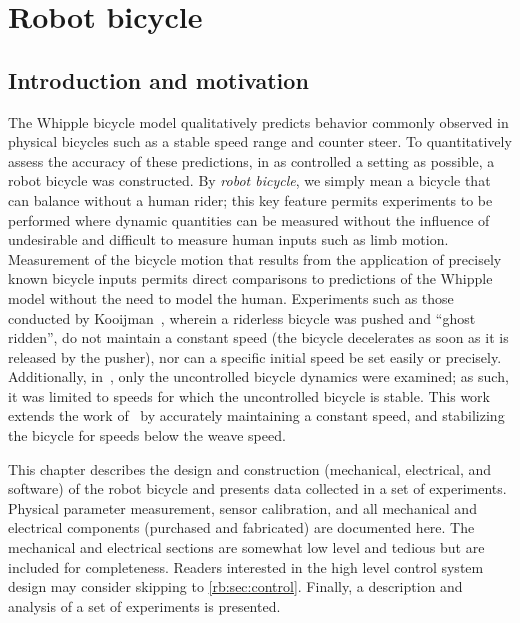 \chapter{Robot bicycle} \label{chapter4}

\section{Introduction and motivation} \label{rb:sec:intro}

The Whipple bicycle model qualitatively predicts behavior commonly observed in
physical bicycles such as a stable speed range and counter steer. To
quantitatively assess the accuracy of these predictions, in as controlled a
setting as possible, a robot bicycle was constructed. By \textit{robot
bicycle}, we simply mean a bicycle that can balance without a human rider; this key
feature permits experiments to be performed where dynamic quantities can be
measured without the influence of undesirable and difficult to measure human
inputs such as limb motion. Measurement of the bicycle motion that results from
the application of precisely known bicycle inputs permits direct comparisons to
predictions of the Whipple model without the need to model the human.
Experiments such as those conducted by Kooijman~\cite{Kooijman2007}, wherein a
riderless bicycle was pushed and ``ghost ridden'', do not maintain a constant
speed (the bicycle decelerates as soon as it is released by the pusher), nor
can a specific initial speed be set easily or precisely. Additionally,
in~\cite{Kooijman2007}, only the uncontrolled bicycle dynamics were examined;
as such, it was limited to speeds for which the uncontrolled bicycle is stable.
This work extends the work of~\cite{Kooijman2007} by accurately maintaining a
constant speed, and stabilizing the bicycle for speeds below the weave speed.


This chapter describes the design and construction (mechanical, electrical, and
software) of the robot bicycle and presents data collected in a set of experiments.
Physical parameter measurement, sensor calibration, and all mechanical and
electrical components (purchased and fabricated) are documented here. The
mechanical and electrical sections are somewhat low level and tedious but are
included for completeness. Readers interested in the high level control system
design may consider skipping to \autoref{rb:sec:control}. Finally, a
description and analysis of a set of experiments is presented.

